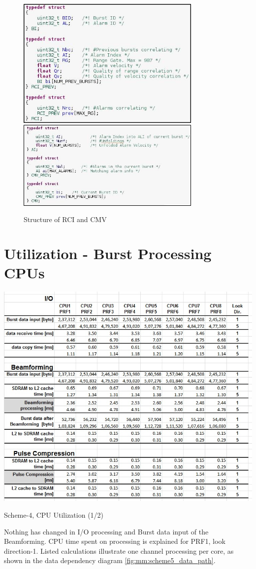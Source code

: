 \begin{figure}[h!]
	\centering
	\includegraphics[width=90mm]{figures/biv_struct1}
	\includegraphics[width=90mm]{figures/biv_struct2}
	\caption{Structure of RCI and CMV}
	\label{fig:mm:biv_struct}
\end{figure}

\section{Utilization - Burst Processing CPUs}
\label{app:sch4_cpu_util}
\begin{table}[h!]
	\centering
	\includegraphics[width=160mm]{figures/scheme5_cpu_util1}
	\caption{Scheme-4, CPU Utilization (1/2)}
	\label{fig:mm:scheme5_cpu_util1}
\end{table}
Nothing has changed in I/O processing and Burst data input of the Beamforming. CPU time spent on processing is explained for PRF1, look direction-1. Listed calculations illustrate one channel processing per core, as shown in the data dependency diagram \ref{fig:mm:scheme5_data_path}.

